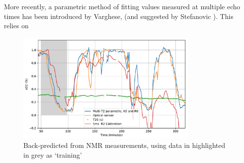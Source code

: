 More recently, a parametric method of fitting \Ttwo values measured at multiple echo times has been introduced by Varghese\cite{VargheseCMRbasedbloodoximetry2017}, (and suggested by Stefanovic \cite{StefanovicHumanwholebloodrelaxometry2004}).
This relies on
\begin{figure}[t]
\centering
\includegraphics[width=0.8\textwidth]{figures/contflow/calibratedNMRSO2.pdf}
\caption[Back-predicted \SOtwo from NMR measurements]{Back-predicted \SOtwo from NMR measurements, using data in highlighted in grey as `training'}
\label{fig:contflow-NMRSO2}
\end{figure}
